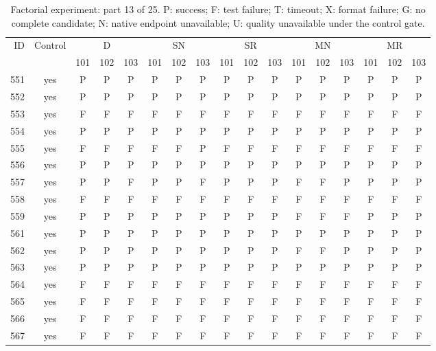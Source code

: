 \begin{table}[p]\centering\footnotesize
\setlength{\tabcolsep}{3pt}
\caption{Factorial experiment: part 13 of 25. P: success; F: test failure; T: timeout; X: format failure; G: no complete candidate; N: native endpoint unavailable; U: quality unavailable under the control gate.}
\begin{tabular*}{\textwidth}{@{\extracolsep{\fill}}rcccccccccccccccc}\toprule
ID & Control & \multicolumn{3}{c}{D} & \multicolumn{3}{c}{SN} & \multicolumn{3}{c}{SR} & \multicolumn{3}{c}{MN} & \multicolumn{3}{c}{MR}\\
\cmidrule(lr){3-5}\cmidrule(lr){6-8}\cmidrule(lr){9-11}\cmidrule(lr){12-14}\cmidrule(lr){15-17}
 & & 101 & 102 & 103 & 101 & 102 & 103 & 101 & 102 & 103 & 101 & 102 & 103 & 101 & 102 & 103\\\midrule
551 & yes & P & P & P & P & P & P & P & P & P & P & P & P & P & P & P\\
552 & yes & P & P & P & P & P & P & P & P & P & P & P & P & P & P & P\\
553 & yes & F & F & F & F & F & F & F & F & F & F & F & F & F & F & F\\
554 & yes & P & P & P & P & P & P & P & P & P & P & P & P & P & P & P\\
555 & yes & F & F & F & F & F & P & F & F & F & F & F & F & F & F & F\\
556 & yes & P & P & P & P & P & P & P & P & P & P & P & P & P & P & P\\
557 & yes & P & P & F & P & P & F & P & P & P & F & F & P & P & P & P\\
558 & yes & F & F & F & F & F & F & F & F & F & F & F & F & F & F & F\\
559 & yes & P & P & P & P & P & P & P & P & P & F & F & F & P & P & P\\
561 & yes & P & P & P & P & P & P & P & P & P & P & P & P & P & P & P\\
562 & yes & P & P & P & P & P & P & P & P & P & F & F & P & P & P & P\\
563 & yes & P & P & P & P & P & P & P & P & P & P & P & P & P & P & P\\
564 & yes & F & F & F & F & F & F & F & F & F & F & F & F & F & F & F\\
565 & yes & F & F & F & F & F & F & F & F & F & F & F & F & F & F & F\\
566 & yes & F & F & F & F & F & F & F & F & F & F & F & F & F & F & F\\
567 & yes & F & F & F & F & F & F & F & F & F & F & F & F & F & F & F\\

\end{tabular*}
\end{table}
